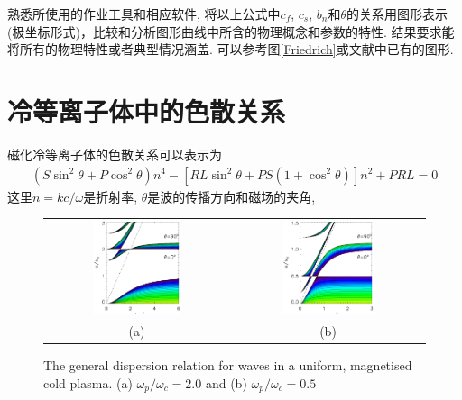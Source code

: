 \documentclass[landscape]{article}
\begin{document}
	熟悉所使用的作业工具和相应软件, 将以上公式中$c_f$, $c_s$,
	$b_n$和$\theta$的关系用图形表示(极坐标形式)，比较和分析图形曲线中所含的物理概念和参数的特性.
	结果要求能将所有的物理特性或者典型情况涵盖. 可以参考图\ref{Friedrich}或文献\citet{Jeffrey1964}中已有的图形.
	
	
	\section{冷等离子体中的色散关系}
	
	磁化冷等离子体的色散关系可以表示为\citep{Diver2001}
	\begin{align}
		\left(S \sin^2 \theta + P \cos^2 \theta\right) n^4 - \left[R L \sin^2 \theta
		+ P S \left(1 + \cos^2 \theta\right) \right] n^2 + P R L= 0 \label{Eqn:Colp}
	\end{align}
	这里$n = k c / \omega$是折射率, $\theta$是波的传播方向和磁场的夹角,
	\begin{figure}[htb]
		\begin{tabular}{cc}
			\includegraphics[width=0.5\textwidth]{figure2_1.eps} &
			\includegraphics[width=0.5\textwidth]{figure2_2.eps}
			\\
			(a) & (b)
		\end{tabular}
		\caption{The general dispersion relation for waves in a uniform, magnetised cold
			plasma. (a) $\omega_p / \omega_c = 2.0$ and (b) $\omega_p / \omega_c = 0.5$} \label{ColdPlasma}
	\end{figure}
\end{document}

